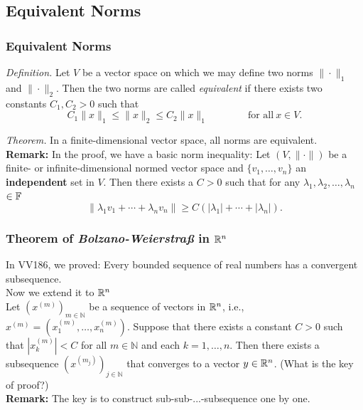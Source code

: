 \documentclass[12pt, t]{beamer}
\renewcommand{\emph}[1]{{\color{Turquoise3}\textsl{#1}}}
\newcommand{\N}{\mathbb{N}}
\newcommand{\myseries}[2]{$#1_1,#1_2,\dots,#1_#2$}
\newcommand{\nullspace}{~\\[15pt]}
\begin{document}
\subsection{Equivalent Norms}
\begin{frame}
    \frametitle{Equivalent Norms}
    \emph{Definition.} Let $V$ be a vector space on which we may define two norms $\|\cdot\|_1$ and $\|\cdot\|_2$. Then the two norms are called \emph{equivalent} if there exists two constants $C_1,C_2>0$ such that
    \begin{equation}\label{2.1.3}
        C_1\|x\|_1\leq\|x\|_2\leq C_2\|x\|_1\qquad\qquad\text{for all}~x\in V.
    \end{equation}

    \emph{Theorem.} In a finite-dimensional vector space, all norms are equivalent.
    \nullspace
    \textbf{Remark:} In the proof, we have a basic norm inequality:
    Let $(V,\|\cdot\|)$ be a finite- or infinite-dimensional normed vector space and $\{v_1,\ldots,v_n\}$ an \textbf{independent} set in $V$. Then there exists a $C>0$ such that for any \myseries{\lambda}{n}$\in\mathbb{F}$
    \begin{equation}\label{2.1.5}
        \|\lambda_1v_1+\cdots+\lambda_nv_n\|\geq C\left(|\lambda_1|+\cdots+|\lambda_n|\right).
    \end{equation}
\end{frame}

\begin{frame}
    \frametitle{Theorem of \textit{Bolzano-Weierstra\ss} in $\mathbb{R}^n$}
    In VV186, we proved: Every bounded sequence of real
    numbers has a convergent subsequence.
    \nullspace
    Now we extend it to $\mathbb{R}^n$
    \nullspace


    Let $(x^{(m)})_{m\in\N}$ be a sequence of vectors in $\mathbb{R}^n$, i.e., $x^{(m)}=\left(x_1^{(m)},\ldots,x_n^{(m)}\right)$. Suppose that there exists a constant $C>0$ such that $\left|x_k^{(m)}\right|<C$ for all $m\in\N$ and each $k=1,\ldots,n$. Then there exists a subsequence $\left(x^{(m_j)}\right)_{j\in\N}$ that converges to a vector $y\in\mathbb{R}^n$. (What is the key of proof?)
    \nullspace\pause
    \textbf{Remark:} The key is to construct sub-sub-...-subsequence one by one.


\end{frame}
\end{document}
